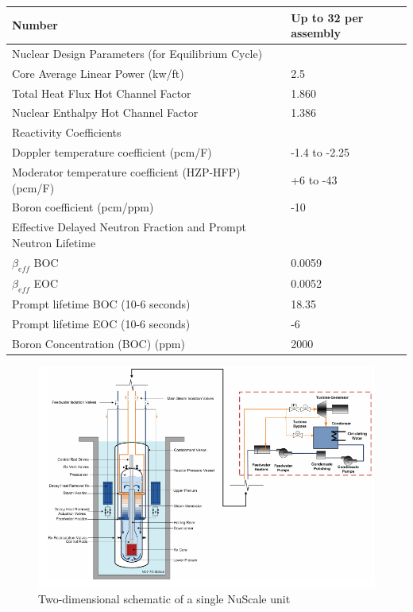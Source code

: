 \documentclass[10pt,a4paper]{article}
\begin{document}
\begin{table} [htbp]
\begin{center}
\begin{tabular}{l     l}
Number &Up to 32 per assembly\\
\hline 
Nuclear Design Parameters (for Equilibrium Cycle)\\
Core Average Linear Power (kw/ft)&2.5     \\
Total Heat Flux Hot Channel Factor&1.860  \\
Nuclear Enthalpy Hot Channel Factor&1.386  \\
\hline 
Reactivity Coefficients\\
Doppler temperature coefficient (pcm/F)&-1.4 to -2.25\\
Moderator temperature coefficient (HZP-HFP) (pcm/F)&+6 to -43     \\
Boron coefficient (pcm/ppm)&-10             \\
\hline 
Effective Delayed Neutron Fraction 
and Prompt Neutron Lifetime\\
$\beta_{eff}$ BOC&0.0059\\
$ \beta _{eff}$ EOC&0.0052\\
Prompt lifetime BOC (10-6 seconds)&18.35  \\
Prompt lifetime EOC (10-6 seconds)&-6       \\
\hline 
Boron Concentration (BOC) (ppm)&2000\\
\hline 

\end{tabular}
\end{center}
\end{table}

\begin{figure}[htbp]
\centering
\includegraphics[scale=0.7]{Figs/fig4.jpeg}
\caption{ Two-dimensional schematic of a single NuScale unit}
\label{Nu2d}
\end{figure}
\end{document}
